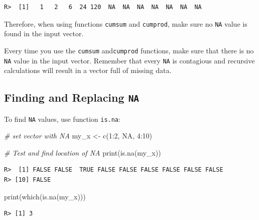 \documentclass[
  12pt,
]{book}
\newenvironment{Shaded}{\begin{snugshade}}{\end{snugshade}}
\newcommand{\CommentTok}[1]{\textcolor[rgb]{0.37,0.37,0.37}{\textit{#1}}}
\newcommand{\ConstantTok}[1]{\textcolor[rgb]{0,0,0}{#1}}
\newcommand{\DecValTok}[1]{\textcolor[rgb]{0.06,0.06,0.06}{#1}}
\newcommand{\FunctionTok}[1]{\textcolor[rgb]{0,0,0}{#1}}
\newcommand{\NormalTok}[1]{#1}
\newcommand{\OtherTok}[1]{\textcolor[rgb]{0.37,0.37,0.37}{#1}}
\newcommand{\SpecialCharTok}[1]{\textcolor[rgb]{0,0,0}{#1}}
\newenvironment{rmdcaution}
{\begin{cautionblock}
		
	} {\end{cautionblock}}
\begin{document}
\begin{verbatim}
R>  [1]   1   2   6  24 120  NA  NA  NA  NA  NA  NA  NA
\end{verbatim}

Therefore, when using functions \texttt{cumsum} and \texttt{cumprod}, make sure no \texttt{NA} value is found in the input vector.

\begin{rmdcaution}
Every time you use the \texttt{cumsum} and\texttt{cumprod} functions,
make sure that there is no \texttt{NA} value in the input vector.
Remember that every \texttt{NA} is contagious and recursive calculations
will result in a vector full of missing data.
\end{rmdcaution}

\hypertarget{finding-and-replacing-na}{%
\subsection{\texorpdfstring{Finding and Replacing \texttt{NA}}{Finding and Replacing NA}}\label{finding-and-replacing-na}}

To find \texttt{NA} values, use function \texttt{is.na}: 

\begin{Shaded}
\begin{Highlighting}[]
\CommentTok{\# set vector with NA}
\NormalTok{my\_x }\OtherTok{\textless{}{-}} \FunctionTok{c}\NormalTok{(}\DecValTok{1}\SpecialCharTok{:}\DecValTok{2}\NormalTok{, }\ConstantTok{NA}\NormalTok{, }\DecValTok{4}\SpecialCharTok{:}\DecValTok{10}\NormalTok{)}

\CommentTok{\# Test and find location of NA}
\FunctionTok{print}\NormalTok{(}\FunctionTok{is.na}\NormalTok{(my\_x))}
\end{Highlighting}
\end{Shaded}

\begin{verbatim}
R>  [1] FALSE FALSE  TRUE FALSE FALSE FALSE FALSE FALSE FALSE
R> [10] FALSE
\end{verbatim}

\begin{Shaded}
\begin{Highlighting}[]
\FunctionTok{print}\NormalTok{(}\FunctionTok{which}\NormalTok{(}\FunctionTok{is.na}\NormalTok{(my\_x)))}
\end{Highlighting}
\end{Shaded}

\begin{verbatim}
R> [1] 3
\end{verbatim}
\end{document}
